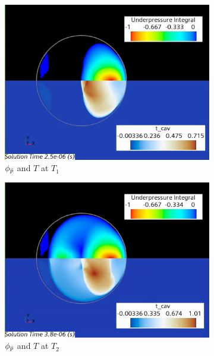 \documentclass{UCF_ETD}
\begin{document}
\begin{figure}
    \centering
    \begin{subfigure}[b]{0.3\textwidth}
        \centering
        \includegraphics[width=\textwidth]{Figures/init_shock.png}
        \caption{$\phi_{\Bar{p}}$ and $T$ at $T_{1}$}
        \label{subfig:initialWave}
    \end{subfigure}
    \begin{subfigure}[b]{0.3\textwidth}
        \centering
        \includegraphics[width=\textwidth]{Figures/reflect_1.png}
        \caption{$\phi_{\Bar{p}}$ and $T$ at $T_{2}$}
        \label{subfig:first_reflection}
    \end{subfigure}
    \begin{subfigure}[b]{0.3\textwidth}

\end{subfigure}
\end{figure}
\end{document}
